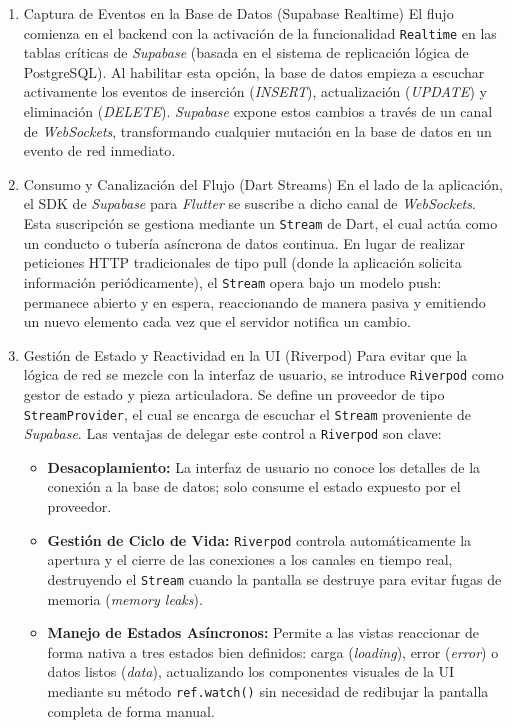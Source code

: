 \begin{enumerate}

    \item Captura de Eventos en la Base de Datos (Supabase Realtime)
El flujo comienza en el backend con la activación de la funcionalidad \texttt{Realtime} en las tablas críticas de \textit{Supabase} (basada en el sistema de replicación lógica de PostgreSQL). Al habilitar esta opción, la base de datos empieza a escuchar activamente los eventos de inserción (\textit{INSERT}), actualización (\textit{UPDATE}) y eliminación (\textit{DELETE}). \textit{Supabase} expone estos cambios a través de un canal de \textit{WebSockets}, transformando cualquier mutación en la base de datos en un evento de red inmediato.

    \item Consumo y Canalización del Flujo (Dart Streams)
En el lado de la aplicación, el SDK de \textit{Supabase} para \textit{Flutter} se suscribe a dicho canal de \textit{WebSockets}. Esta suscripción se gestiona mediante un \texttt{Stream} de Dart, el cual actúa como un conducto o tubería asíncrona de datos continua. En lugar de realizar peticiones HTTP tradicionales de tipo pull (donde la aplicación solicita información periódicamente), el \texttt{Stream} opera bajo un modelo push: permanece abierto y en espera, reaccionando de manera pasiva y emitiendo un nuevo elemento cada vez que el servidor notifica un cambio.

    \item Gestión de Estado y Reactividad en la UI (Riverpod)
Para evitar que la lógica de red se mezcle con la interfaz de usuario, se introduce \texttt{Riverpod} como gestor de estado y pieza articuladora. Se define un proveedor de tipo \texttt{StreamProvider}, el cual se encarga de escuchar el \texttt{Stream} proveniente de \textit{Supabase}. Las ventajas de delegar este control a \texttt{Riverpod} son clave:
\begin{itemize}
\item \textbf{Desacoplamiento:} La interfaz de usuario no conoce los detalles de la conexión a la base de datos; solo consume el estado expuesto por el proveedor.
\item \textbf{Gestión de Ciclo de Vida:} \texttt{Riverpod} controla automáticamente la apertura y el cierre de las conexiones a los canales en tiempo real, destruyendo el \texttt{Stream} cuando la pantalla se destruye para evitar fugas de memoria (\textit{memory leaks}).
\item \textbf{Manejo de Estados Asíncronos:} Permite a las vistas reaccionar de forma nativa a tres estados bien definidos: carga (\textit{loading}), error (\textit{error}) o datos listos (\textit{data}), actualizando los componentes visuales de la UI mediante su método \texttt{ref.watch()} sin necesidad de redibujar la pantalla completa de forma manual.
\end{itemize}

\end{enumerate}

